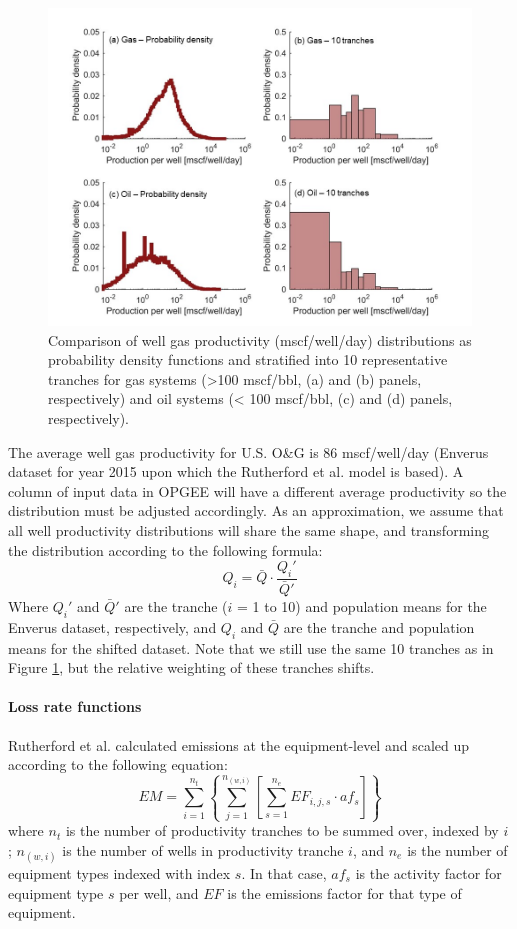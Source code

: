\documentclass[11pt]{report}
\begin{document}
 \begin{figure}[t]
\includegraphics[width=0.8\columnwidth]{images/Productivity_tranche_VF.jpg}
\caption{Comparison of well gas productivity (mscf/well/day) distributions as probability density functions and stratified into 10 representative tranches for gas systems (>100 mscf/bbl, (a) and (b) panels, respectively) and oil systems (< 100 mscf/bbl, (c) and (d) panels, respectively).}
\label{fig:productivity_tranche_VF}
\end{figure} 

The average well gas productivity for U.S. O\&G is 86 mscf/well/day (Enverus dataset for year 2015 \cite{Enverus2020} upon which the Rutherford et al. model is based). A column of input data in OPGEE will have a different average productivity so the distribution must be adjusted accordingly. As an approximation, we assume that all well productivity distributions will share the same shape, and transforming the distribution according to the following formula:
\begin{equation}
Q_i = \bar{Q}\cdot \frac{Q_i' }{\bar{Q}'} 
\end{equation}
Where $Q_i'$ and $\bar{Q}'$ are the tranche ($i$ = 1 to 10) and population means for the Enverus dataset, respectively, and $Q_i$ and $\bar{Q}$ are the tranche and population means for the shifted dataset. Note that we still use the same 10 tranches as in Figure \ref{fig:productivity_tranche_VF}, but the relative weighting of these tranches shifts.

\paragraph{Loss rate functions}
Rutherford et al. calculated emissions at the equipment-level and scaled up according to the following equation:
\begin{equation}
EM=\sum_{i=1}^{n_t} \left\{ \sum_{j=1}^{n_{(w,i)}} \left[ \sum_{s=1}^{n_e} EF_{i,j,s} \cdot af_s \right] \right\} 
\end{equation}
where $n_t$ is the number of productivity tranches to be summed over, indexed by $i$; $n_{(w,i)}$ is the number of wells in productivity tranche $i$, and $n_e$ is the number of equipment types indexed with index $s$. In that case, $af_s$ is the activity factor for equipment type $s$ per well, and $EF$ is the emissions factor for that type of equipment.
\end{document}
